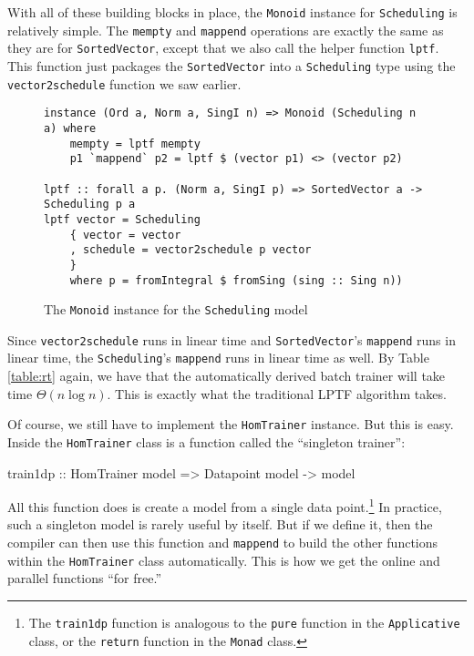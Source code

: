 \documentclass[tikz]{tmr}
\newcommand\h{\lstinline}
\newcommand\+{\mdoubleplus}
\begin{document}
With all of these building blocks in place, the \h{Monoid} instance for \h{Scheduling} is relatively simple.
The \h{mempty} and \h{mappend} operations are exactly the same as they are for \h{SortedVector}, except that we also call the helper function \h{lptf}.
This function just packages the \h{SortedVector} into a \h{Scheduling} type using the \h{vector2schedule} function we saw earlier.
\begin{figure}[H]
\begin{lstlisting}
instance (Ord a, Norm a, SingI n) => Monoid (Scheduling n a) where
    mempty = lptf mempty
    p1 `mappend` p2 = lptf $ (vector p1) <> (vector p2)
    
lptf :: forall a p. (Norm a, SingI p) => SortedVector a -> Scheduling p a
lptf vector = Scheduling
    { vector = vector
    , schedule = vector2schedule p vector
    }
    where p = fromIntegral $ fromSing (sing :: Sing n))
\end{lstlisting}
\caption{The \h{Monoid} instance for the \h{Scheduling} model}
\end{figure}
Since \h{vector2schedule} runs in linear time and \h{SortedVector}'s \h{mappend} runs in linear time, the \h{Scheduling}'s \h{mappend} runs in linear time as well.
By Table \ref{table:rt} again, we have that the automatically derived batch trainer will take time $\Theta(n\log n)$.
This is exactly what the traditional LPTF algorithm takes.

Of course, we still have to implement the \h{HomTrainer} instance.
But this is easy.
Inside the \h{HomTrainer} class is a function called the ``singleton trainer'':
\begin{spec}
train1dp :: HomTrainer model => Datapoint model -> model
\end{spec}
All this function does is create a model from a single data point.\footnote{The \h{train1dp} function is analogous to the \h{pure} function in the \h{Applicative} class, or the \h{return} function in the \h{Monad} class.}
In practice, such a singleton model is rarely useful by itself.
But if we define it, then the compiler can then use this function and \h{mappend} to build the other functions within the \h{HomTrainer} class automatically.
This is how we get the online and parallel functions ``for free.''
\end{document}
